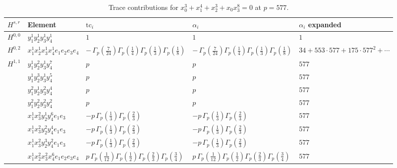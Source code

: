 \documentclass[11pt]{article}
\begin{document}
\begin{table}[ht]
\centering
\caption{Trace contributions for $x_0^{3} + x_1^{4} + x_2^{3} + x_0 x_3^{8} = 0$ at $p=577$.}\label{tab:deformed-31}
\renewcommand{\arraystretch}{1.1}
{\scriptsize
\begin{tabular}{@{}lllll@{}}
\toprule
$H^{s,r}$ & Element & $\mathrm{tc}_i$ & $\alpha_i$ & $\alpha_i$ expanded \\
\midrule
$H^{0,0}$ & $y_{1}^{1} y_{2}^{1} y_{3}^{1} y_{4}^{1}$ & $1$ & $1$ & $1$ \\
\midrule
$H^{0,2}$ & $x_{1}^{1} x_{2}^{1} x_{3}^{1} x_{4}^{1}  e_{1} e_{2} e_{3} e_{4}$ & $- \, \Gamma_p \left( \frac{7}{24} \right) \Gamma_p \left( \frac{1}{4} \right) \Gamma_p \left( \frac{1}{3} \right) \Gamma_p \left( \frac{1}{8} \right)$ & $- \, \Gamma_p \left( \frac{7}{24} \right) \Gamma_p \left( \frac{1}{4} \right) \Gamma_p \left( \frac{1}{3} \right) \Gamma_p \left( \frac{1}{8} \right)$ & $34{+}553{\cdot}577{+}175{\cdot}577^{2}{+}\cdots$ \\
\midrule
$H^{1,1}$ & $y_{1}^{1} y_{2}^{2} y_{3}^{1} y_{4}^{7}$ & $p \,$ & $p \,$ & $577$ \\
 & $y_{1}^{1} y_{2}^{3} y_{3}^{1} y_{4}^{5}$ & $p \,$ & $p \,$ & $577$ \\
 & $y_{1}^{2} y_{2}^{1} y_{3}^{2} y_{4}^{4}$ & $p \,$ & $p \,$ & $577$ \\
 & $y_{1}^{2} y_{2}^{2} y_{3}^{2} y_{4}^{2}$ & $p \,$ & $p \,$ & $577$ \\
 & $x_{1}^{1} x_{3}^{2} y_{2}^{1} y_{4}^{6} e_{1} e_{3}$ & $- p \, \Gamma_p \left( \frac{1}{3} \right) \Gamma_p \left( \frac{2}{3} \right)$ & $- p \, \Gamma_p \left( \frac{1}{3} \right) \Gamma_p \left( \frac{2}{3} \right)$ & $577$ \\
 & $x_{1}^{1} x_{3}^{2} y_{2}^{2} y_{4}^{4} e_{1} e_{3}$ & $- p \, \Gamma_p \left( \frac{1}{3} \right) \Gamma_p \left( \frac{2}{3} \right)$ & $- p \, \Gamma_p \left( \frac{1}{3} \right) \Gamma_p \left( \frac{2}{3} \right)$ & $577$ \\
 & $x_{1}^{1} x_{3}^{2} y_{2}^{3} y_{4}^{2} e_{1} e_{3}$ & $- p \, \Gamma_p \left( \frac{1}{3} \right) \Gamma_p \left( \frac{2}{3} \right)$ & $- p \, \Gamma_p \left( \frac{1}{3} \right) \Gamma_p \left( \frac{2}{3} \right)$ & $577$ \\
 & $x_{1}^{1} x_{2}^{2} x_{3}^{2} x_{4}^{6}  e_{1} e_{2} e_{3} e_{4}$ & $p \, \Gamma_p \left( \frac{1}{12} \right) \Gamma_p \left( \frac{1}{2} \right) \Gamma_p \left( \frac{2}{3} \right) \Gamma_p \left( \frac{3}{4} \right)$ & $p \, \Gamma_p \left( \frac{1}{12} \right) \Gamma_p \left( \frac{1}{2} \right) \Gamma_p \left( \frac{2}{3} \right) \Gamma_p \left( \frac{3}{4} \right)$ & $577$ \\

\end{tabular}}
\end{table}
\end{document}
